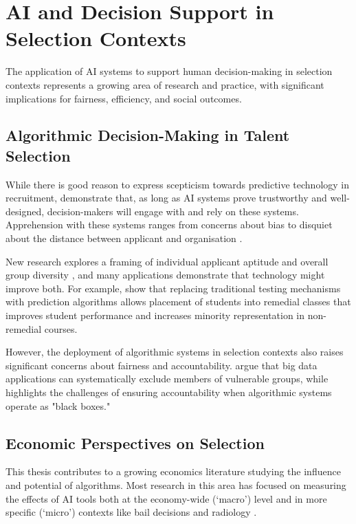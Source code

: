 \section{AI and Decision Support in Selection Contexts}\label{sec:ai_selection}

The application of AI systems to support human decision-making in selection contexts represents a growing area of research and practice, with significant implications for fairness, efficiency, and social outcomes.

\subsection{Algorithmic Decision-Making in Talent Selection}\label{ssec:algorithmic_selection}
While there is good reason to express scepticism towards predictive technology in recruitment, \textcite{Vereschak_Alizadeh_Bailly_Caramiaux_2024} demonstrate that, as long as AI systems prove trustworthy and well-designed, decision-makers will engage with and rely on these systems. Apprehension with these systems ranges from concerns about bias to disquiet about the distance between applicant and organisation \cite{Lashkari_Cheng_2023}.

New research explores a framing of individual applicant aptitude and overall group diversity \cite{noray2023systemic}, and many applications demonstrate that technology might improve both. For example, \textcite{bergman2021seven} show that replacing traditional testing mechanisms with prediction algorithms allows placement of students into remedial classes that improves student performance and increases minority representation in non-remedial courses.

However, the deployment of algorithmic systems in selection contexts also raises significant concerns about fairness and accountability. \textcite{barocas_big_2016} argue that big data applications can systematically exclude members of vulnerable groups, while \textcite{pasquale2015black} highlights the challenges of ensuring accountability when algorithmic systems operate as "black boxes."

\subsection{Economic Perspectives on Selection}\label{ssec:economic_perspectives}
This thesis contributes to a growing economics literature studying the influence and potential of algorithms. Most research in this area has focused on measuring the effects of AI tools both at the economy-wide (`macro') level \cite{acemoglu2022automation,babina2024artificial} and in more specific (`micro') contexts like bail decisions and radiology \cite{albright2023hidden,kleinberg2015prediction,stevenson2019algorithmic}.

